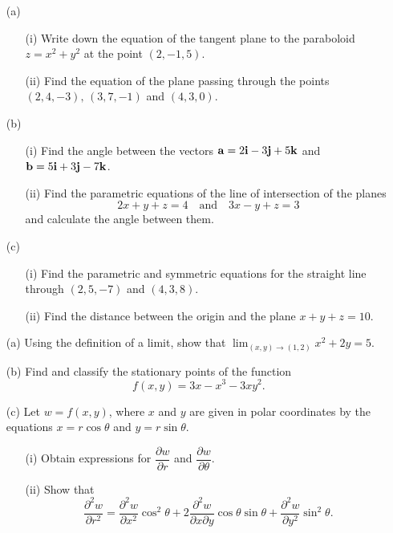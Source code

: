 \documentclass[12pt]{uz-exame}
\begin{document}
\sectionBscience
\begin{question}
\begin{itemize}
\item[(a)] \begin{itemize}
\item[(i)] Write down the equation of the tangent plane to the paraboloid  $z=x^2+y^2$ at the point $(2,-1,5)$. 
\item[(ii)] Find the equation of the plane passing through the points\\ $(2,4,-3), \, (3,7,-1)$ and $(4,3,0)$. 
\end{itemize}
\item[(b)]
\begin{itemize}
\item[(i)] Find the angle between the vectors ${\bf{a}}=2{\bf{i}}-3{\bf{j}}+5{\bf{k}}$ and ${\bf{b}}=5{\bf{i}}+3{\bf{j}}-7{\bf{k}}$. 
\item[(ii)] Find the parametric equations of the line of intersection of the planes 
\[2x+y+z=4 \quad \mbox{and} \quad 3x-y+z=3\] and calculate the angle between them. 
\end{itemize}
\item[(c)] \begin{itemize}
\item[(i)] Find the parametric and symmetric equations for the straight line through $(2,5,-7)$ and $(4,3,8)$. 
\item[(ii)] Find the distance between the origin and the plane $x+y+z=10$. 
\end{itemize}
\end{itemize}
\end{question}
\begin{question}
\begin{itemize}
\item[(a)] Using the definition of a limit, show that $\displaystyle \lim _{(x,y)\rightarrow (1,2)} x^2+2y=5$. 
\item[(b)] Find and classify the stationary points of the function \[f(x,y)=3x-x^3-3xy^2.\] 
\item[(c)] Let $w=f(x,y)$, where $x$ and $y$ are given in polar coordinates by the equations $x=r\cos \theta$ and $y=r\sin \theta$.
\begin{itemize}
\item[(i)] Obtain expressions for $\dfrac{\partial w}{\partial r}$ and $ \dfrac{\partial w}{\partial \theta}$.  
\item[(ii)] Show that 
\[\dfrac{\partial ^2 w}{\partial r^2}=\dfrac{\partial ^2 w}{\partial x^2}\cos ^2 \theta +2\dfrac{\partial ^2 w}{\partial x\partial y}\cos \theta \sin \theta +\dfrac{\partial ^2 w}{\partial y^2}\sin ^2 \theta.\]
\end{itemize}
\end{itemize}
\end{question}
\end{document}

